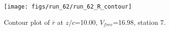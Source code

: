 \begin{figure}[H]
\centering
\texttt{[image: figs/run\_62/run\_62\_R\_contour]}
\caption{Contour plot of $\overline{r}$ at $z/c$=10.00, $V_{free}$=16.98, station 7.}
\end{figure}


